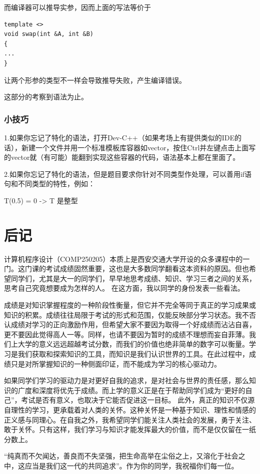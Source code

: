 \documentclass[UTF8]{ctexart}
\begin{document}
而编译器可以推导实参，因而上面的写法等价于
\begin{lstlisting}
template <>
void swap(int &A, int &B)
{
...
}
\end{lstlisting}

让两个形参的类型不一样会导致推导失败，产生编译错误。

这部分的考察到语法为止。

\subsubsection{小技巧}
1.如果你忘记了特化的语法，打开Dev-C++（如果考场上有提供类似的IDE的话），新建一个文件并用一个标准模板库容器如vector，按住Ctrl并左键点击上面写的vector就（有可能）能翻到实现这些容器的代码，语法基本上都在里面了。

2.如果你忘记了特化的语法，但是题目要求你针对不同类型作处理，可以善用if语句和不同类型的特性，例如：

T(0.5) = 0 -> T 是整型
\newpage
\section{后记}
计算机程序设计（COMP250205）本质上是西安交通大学开设的众多课程中的一门。这门课的考试成绩固然重要，这也是大多数同学翻看这本资料的原因。但也希望同学们，尤其是大一的同学们，早早地思考成绩、知识、学习三者之间的关系，思考自己究竟想要成为怎样的人。
在这方面，我以同学的身份发表一些看法。

成绩是对知识掌握程度的一种阶段性衡量，但它并不完全等同于真正的学习成果或知识的积累。成绩往往局限于考试的形式和范围，仅能反映部分学习状态。我不否认成绩对学习的正向激励作用，但希望大家不要因为取得一个好成绩而沾沾自喜，
更不要因此觉得高人一等。同样，也请不要因为暂时的成绩不理想而妄自菲薄。我们上大学的意义远远超越考试分数，而我们的价值也绝非简单的数字可以衡量。学习是我们获取和探索知识的工具，而知识是我们认识世界的工具。在此过程中，成绩只是对所掌握知识的一种侧面印证，而不能成为学习的核心驱动力。

如果同学们学习的驱动力是对更好自我的追求，是对社会与世界的责任感，那么知识的广度和深度将优先于成绩。而上学的意义正是在于帮助同学们成为“更好的自己”，考试是否有意义，也取决于它能否促进这一目标。
此外，真正的知识不仅源自理性的学习，更承载着对人类的关怀。这种关怀是一种基于知识、理性和情感的正义感与同理心。在自我之外，我希望同学们能关注人类社会的发展，勇于关注、敢于关怀。只有这样，我们学习与知识才能发挥最大的价值，而不是仅仅留在一纸分数上。

“纯真而不欠闻达，善良而不失坚强，把生命高举在尘俗之上，又溶化于社会之中，这应当是我们这一代的共同追求”。作为你的同学，我祝福你们每一位。
\end{document}
